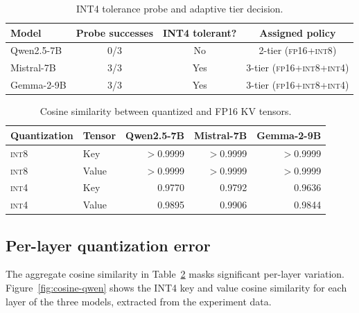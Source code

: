 \documentclass[11pt]{article}
\newcommand{\fp}{\textsc{fp16}}
\newcommand{\intviii}{\textsc{int8}}
\newcommand{\intiv}{\textsc{int4}}
\theoremstyle{plain}
\theoremstyle{definition}
\begin{document}
\begin{table}[t]
\centering
\caption{INT4 tolerance probe and adaptive tier decision.}
\label{tab:probe}
\small
\begin{tabular}{lccc}
\toprule
Model & Probe successes & INT4 tolerant? & Assigned policy \\
\midrule
Qwen2.5-7B & 0/3 & No & 2-tier (\fp{}+\intviii{}) \\
Mistral-7B & 3/3 & Yes & 3-tier (\fp{}+\intviii{}+\intiv{}) \\
Gemma-2-9B & 3/3 & Yes & 3-tier (\fp{}+\intviii{}+\intiv{}) \\
\bottomrule
\end{tabular}
\end{table}

\begin{table}[t]
\centering
\caption{Cosine similarity between quantized and FP16 KV tensors.}
\label{tab:cosine}
\small
\begin{tabular}{llrrr}
\toprule
Quantization & Tensor & Qwen2.5-7B & Mistral-7B & Gemma-2-9B \\
\midrule
\intviii{} & Key & $>$0.9999 & $>$0.9999 & $>$0.9999 \\
\intviii{} & Value & $>$0.9999 & $>$0.9999 & $>$0.9999 \\
\intiv{} & Key & 0.9770 & 0.9792 & 0.9636 \\
\intiv{} & Value & 0.9895 & 0.9906 & 0.9844 \\
\bottomrule
\end{tabular}
\end{table}

\subsection{Per-layer quantization error}
\label{sec:per-layer-quant}

The aggregate cosine similarity in Table~\ref{tab:cosine} masks significant per-layer variation.  Figure~\ref{fig:cosine-qwen} shows the INT4 key and value cosine similarity for each layer of the three models, extracted from the experiment data.
\end{document}
